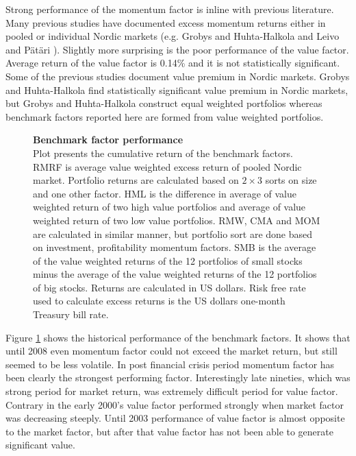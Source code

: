 \documentclass{article}
\begin{document}
Strong performance of the momentum factor is inline with previous literature. Many previous studies have documented excess momentum returns either in pooled or individual Nordic markets (e.g. Grobys and Huhta-Halkola \citeyear{grobys} and Leivo and Pätäri \citeyear{leivo2011}). Slightly more surprising is the poor performance of the value factor. Average return of the value factor is 0.14\% and it is not statistically significant. Some of the previous studies document value premium in Nordic markets. Grobys and Huhta-Halkola \citeyear{grobys} find statistically significant value premium in Nordic markets, but Grobys and Huhta-Halkola construct equal weighted portfolios whereas benchmark factors reported here are formed from value weighted portfolios. \par

\begin{figure}[ht]
\centering
\caption[Benchmark factor performance]{\textbf{Benchmark factor performance}\\ Plot presents the cumulative return of the benchmark factors. RMRF is average value weighted excess return of pooled Nordic market. Portfolio returns are calculated based on $2 \times 3$ sorts on size and one other factor. HML is the difference in average of value weighted return of two high value portfolios and average of value weighted return of two low value portfolios. RMW, CMA and MOM are calculated in similar manner, but portfolio sort are done based on investment, profitability momentum factors. SMB is the average of the value weighted returns of the 12 portfolios of small stocks minus the average of the value weighted returns of the 12 portfolios of big stocks. Returns are calculated in US dollars. Risk free rate used to calculate excess returns is the US dollars one-month Treasury bill rate.}

\label{plot:factor_performance}
\end{figure}

Figure \ref{plot:factor_performance} shows the historical performance of the benchmark factors. It shows that until 2008 even momentum factor could not exceed the market return, but still seemed to be less volatile. In post financial crisis period momentum factor has been clearly the strongest performing factor. Interestingly late nineties, which was strong period for market return, was extremely difficult period for value factor. Contrary in the early 2000's value factor performed strongly when market factor was decreasing steeply. Until 2003 performance of value factor is almost opposite to the market factor, but after that value factor has not been able to generate significant value. \par
\end{document}

